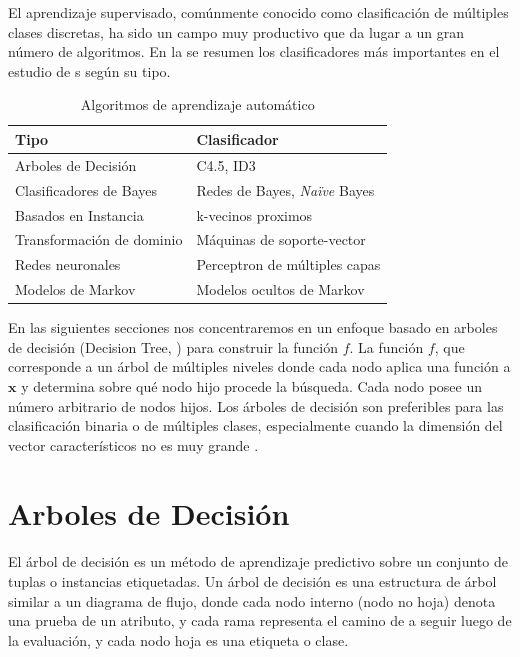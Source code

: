 El aprendizaje supervisado, comúnmente conocido como clasificación de múltiples clases discretas, ha sido un campo muy productivo que da lugar a un gran número de algoritmos. En la  se resumen los clasificadores más importantes en el estudio de s según su tipo.
\begin{table}
\begin{centering}
\begin{tabular}{|l|l|}
\hline 
		Tipo 						& Clasificador							\\
\hline 
\hline 
		Arboles de Decisión 		& C4.5, ID3								\\
\hline 
		Clasificadores de Bayes 	& Redes de Bayes, \emph{Naïve} Bayes	\\
\hline 
		Basados en Instancia 		& k-vecinos proximos					\\
\hline 
		Transformación de dominio 	& Máquinas de soporte-vector			\\
\hline 
		Redes neuronales 			& Perceptron de múltiples capas			\\
\hline 
		Modelos de Markov 			& Modelos ocultos de Markov				\\
\hline
\end{tabular}
\par\end{centering}
\caption[Algoritmos de ]{\label{tab3:clasificadores} Algoritmos de aprendizaje automático}
\end{table}

En las siguientes secciones nos concentraremos en un enfoque basado en arboles de decisión (Decision Tree, ) para construir la función $f$. La función $f$, que corresponde a un árbol de múltiples niveles donde cada nodo aplica una función a $\boldsymbol{x}$ y determina sobre qué nodo hijo procede la búsqueda. Cada nodo posee un número arbitrario de nodos hijos. Los árboles de decisión son preferibles para las clasificación binaria o de múltiples clases, especialmente cuando la dimensión del vector característicos no es muy grande \cite{Rajaraman2011}.

\section{Arboles de Decisión}
El árbol de decisión es un método de aprendizaje predictivo sobre un conjunto de tuplas o instancias etiquetadas. Un árbol de decisión es una estructura de árbol similar a un diagrama de flujo, donde cada nodo interno (nodo no hoja) denota una prueba de un atributo, y cada rama representa el camino de a seguir luego de la evaluación, y cada nodo hoja es una etiqueta o clase.

